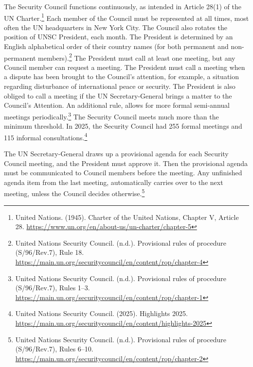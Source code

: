 The Security Council functions continuously, as intended in Article 28(1) of the UN Charter.\footnote{United Nations. (1945). Charter of the United Nations, Chapter V, Article 28. \url{https://www.un.org/en/about-us/un-charter/chapter-5}} Each member of the Council must be represented at all times, most often the UN headquarters in New York City. The Council also rotates the position of UNSC President, each month. The President is determined by an English alphabetical order of their country names (for both permanent and non-permanent members).\footnote{United Nations Security Council. (n.d.). Provisional rules of procedure (S/96/Rev.7), Rule 18. \url{https://main.un.org/securitycouncil/en/content/rop/chapter-4}} The President must call at least one meeting, but any Council member can request a meeting. The President must call a meeting when a dispute has been brought to the Council’s attention, for example, a situation regarding disturbance of international peace or security. The President is also obliged to call a meeting if the UN Secretary-General brings a matter to the Council’s Attention. An additional rule, allows for more formal semi-annual meetings periodically.\footnote{United Nations Security Council. (n.d.). Provisional rules of procedure (S/96/Rev.7), Rules 1–3. \url{https://main.un.org/securitycouncil/en/content/rop/chapter-1}} The Security Council meets much more than the minimum threshold. In 2025, the Security Council had 255 formal meetings and 115 informal consultations.\footnote{United Nations Security Council. (2025). Highlights 2025. \url{https://main.un.org/securitycouncil/en/content/highlights-2025}}

The UN Secretary-General draws up a provisional agenda for each Security Council meeting, and the President must approve it. Then the provisional agenda must be communicated to Council members before the meeting. Any unfinished agenda item from the last meeting, automatically carries over to the next meeting, unless the Council decides otherwise.\footnote{United Nations Security Council. (n.d.). Provisional rules of procedure (S/96/Rev.7), Rules 6–10. \url{https://main.un.org/securitycouncil/en/content/rop/chapter-2}}

